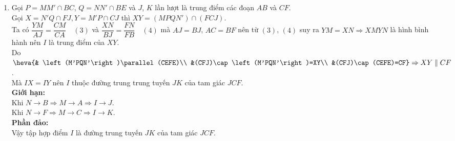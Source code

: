 \begin{bt}
{\begin{enumerate}
{\begin{tikzpicture}[scale=1, font=\footnotesize, line join=round, line cap=round,>=stealth]
\end{tikzpicture}}\noindent
Lại có $MM' \parallel CD\parallel EF \Rightarrow MM'\parallel (DEF) \Rightarrow (DEF)\parallel \left(MNN'M'\right)$.
\item Gọi $P=MM'\cap BC$, $Q=NN'\cap BE$ và $J$, $K$ lần lượt là trung điểm các đoạn $AB$ và $CF$.\\
 Gọi $X=N'Q\cap FJ,Y=M'P\cap CJ$ thì $XY=\left(MPQN'\right)\cap (FCJ)$.\\
Ta có $\dfrac{YM}{AJ}=\dfrac{CM}{CA}\quad (3)$ và $\dfrac{XN}{BJ}=\dfrac{FN}{FB}\quad (4)$ mà $AJ=BJ$, $AC=BF$ nên từ $(3)$, $(4)$ suy ra $YM=XN \Rightarrow XMYN$ là hình bình hành nên $I$ là trung điểm của $XY$.\\
Do $\heva{& \left(M'PQN'\right)\parallel (CEFE)\\ &(CFJ)\cap \left(M'PQN'\right)=XY\\ &(CFJ)\cap (CEFE)=CF} \Rightarrow XY\parallel CF$.\\
Mà  $IX=IY$ nên  $I$ thuộc đường trung trung tuyến $JK$ của tam giác $JCF$.\\
{\bf Giới hạn:}\\
Khi $N \rightarrow B \Rightarrow M \rightarrow A \Rightarrow I \rightarrow J$.\\
Khi $N \rightarrow F \Rightarrow M \rightarrow C \Rightarrow I \rightarrow K$.\\
{\bfseries Phần đảo:}\\
Vậy tập hợp điểm $I$ là đường trung tuyến $JK$ của tam giác $JCF$.
\end{enumerate}
}
\end{bt}

